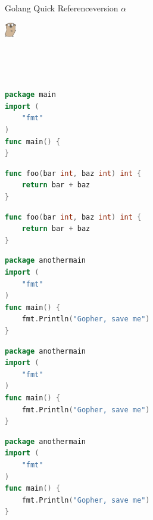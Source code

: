\documentclass{article}
\begin{document}
\noindent
\begin{minipage}{.5\textwidth}
\Large{Golang Quick Reference}\tiny{version $\alpha$}
\end{minipage}%
\begin{minipage}{.5\textwidth}
\begin{adjustbox}{right}
\includegraphics[width=0.5cm]{./figures/gopher.eps}%
\end{adjustbox}%
\end{minipage} \\
\begin{minipage}{\textwidth}
\tt\tiny%
\begin{pagebox}
\setlength\multicolsep{0pt}%
\setlength\columnsep{3pt}%
\begin{multicols}{4}
\begin{codebox}[frametitle={Intro}]
\begin{lstlisting}[language=go]
package main
import (
	"fmt"
)
func main() {
}
\end{lstlisting}
\end{codebox}
\begin{codebox}[frametitle={More}]
\begin{lstlisting}[language=go]
func foo(bar int, baz int) int {
    return bar + baz
}
\end{lstlisting}
\end{codebox}
\begin{codebox}[frametitle={More2}]
\begin{lstlisting}[language=go]
func foo(bar int, baz int) int {
    return bar + baz
}
\end{lstlisting}
\end{codebox}
\begin{codebox}
\begin{lstlisting}[language=go]
package anothermain
import (
	"fmt"
)
func main() {
	fmt.Println("Gopher, save me")
}
\end{lstlisting}
\end{codebox}
\vfill
\columnbreak
\begin{codebox}
\begin{lstlisting}[language=go]
package anothermain
import (
	"fmt"
)
func main() {
	fmt.Println("Gopher, save me")
}
\end{lstlisting}
\end{codebox}
\columnbreak
\begin{codebox}
\begin{lstlisting}[language=go]
package anothermain
import (
	"fmt"
)
func main() {
	fmt.Println("Gopher, save me")
}
\end{lstlisting}
\end{codebox}
\end{multicols}
\end{pagebox}
\end{minipage}
\end{document}
